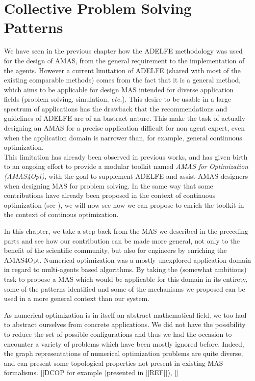 \chapter{Collective Problem Solving Patterns}\label{CPSP}

We have seen in the previous chapter how the ADELFE methodology was used for the design of AMAS, from the general requirement to the implementation of the agents. However a current limitation of ADELFE (shared with most of the existing comparable methods) comes from the fact that it is a general method, which aims to be applicable for design MAS intended for diverse application fields (problem solving, simulation, \emph{etc.}). This desire to be usable in a large spectrum of applications has the drawback that the recommendations and guidelines of ADELFE are of an bastract nature. This make the task of actually designing an AMAS for a precise application difficult for non agent expert, even when the application domain is narrower than, for example, general continuous optimization.\\
This limitation has already been observed in previous works, and has given birth to an ongoing effort to provide a modular toolkit named \emph{AMAS for Optimization (AMAS4Opt)}, with the goal to supplement ADELFE and assist AMAS designers when designing MAS for problem solving. In the same way that some contributions have already been proposed in the context of continuous optimization (see \cite{Ka2011.6}), we will now see how we can propose to enrich the toolkit in the context of continous optimization.

In this chapter, we take a step back from the MAS we described in the preceding parts and see how our contribution can be made more general, not only to the benefit of the scientific community, but also for engineers by enriching the AMAS4Opt. Numerical optimization was a mostly unexplored application domain in regard to multi-agents based algorithms. By taking the (somewhat ambitious) task to propose a MAS which would be applicable for this domain in its entirety, some of the patterns identified and some of the mechanisms we proposed can be used in a more general context than our system.

As numerical optimization is in itself an abstract mathematical field, we too had to abstract ourselves from concrete applications. We did not have the possibility to reduce the set of possible configurations and thus we had the occasion to encounter a variety of problems which have been mostly ignored before. Indeed, the graph representations of numerical optimization problems are quite diverse, and can present some topological properties not present in existing MAS formalisms. [[DCOP for example (presented in [[REF]]), ]]


